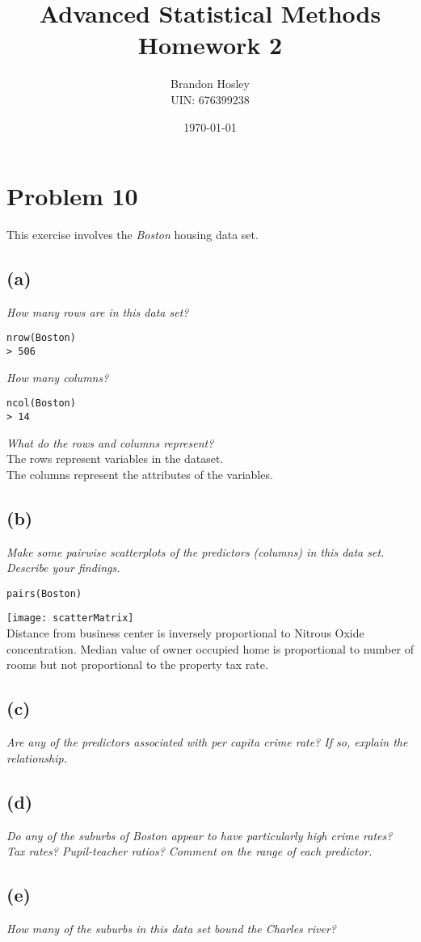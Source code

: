 \documentclass[a4paper,man,natbib]{apa6}
\title{Advanced Statistical Methods Homework 2}
\author{Brandon Hosley \\ UIN: 676399238}
\date{\today}
\affiliation{University of Illinois - Springfield}
\begin{document}
\maketitle
\singlespacing

\section{Problem 10}
This exercise involves the \emph{Boston} housing data set.

\subsection{(a)}
\emph{How many rows are in this data set?} \\
\begin{verbatim}
nrow(Boston)
> 506
\end{verbatim}
\emph{How many columns?}  \\
\begin{verbatim}
ncol(Boston)
> 14
\end{verbatim}
\emph{What do the rows and columns represent?} \\
The rows represent variables in the dataset. \\
The columns represent the attributes of the variables. \\

\subsection{(b)}
\emph{Make some pairwise scatterplots of the predictors (columns) in
this data set. Describe your findings.}
\begin{verbatim}
pairs(Boston)
\end{verbatim}
\texttt{[image: scatterMatrix]} \\
Distance from business center is inversely proportional to Nitrous Oxide concentration.
Median value of owner occupied home is proportional to number of rooms but not proportional to the property tax rate.

\subsection{(c)}
\emph{Are any of the predictors associated with per capita crime rate?
If so, explain the relationship.}

\subsection{(d)}
\emph{Do any of the suburbs of Boston appear to have particularly
high crime rates? Tax rates? Pupil-teacher ratios? Comment on
the range of each predictor.}

\subsection{(e)}
\emph{How many of the suburbs in this data set bound the Charles
river?}
\end{document}
